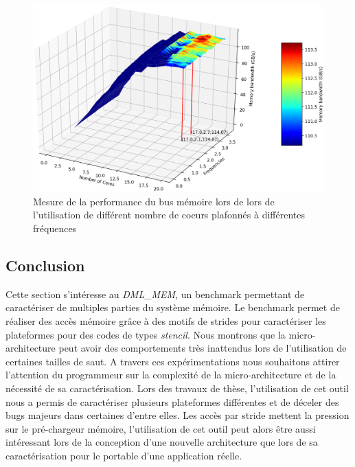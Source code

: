     \begin{figure}
    \center
    \includegraphics[width=14cm]{images/dml_core_vs_freq.png}
    \caption{\label{pic:dml_core_vs_freq} Mesure de la performance du bus mémoire lors de lors de l'utilisation de différent nombre de coeurs plafonnés à différentes fréquences}
    \end{figure}
    


    
    

\subsection{Conclusion}

    Cette section s'intéresse au \textit{DML\_MEM}, un benchmark permettant de caractériser de multiples parties du système mémoire. Le benchmark permet de réaliser des accès mémoire grâce à des motifs de strides pour caractériser les plateformes pour des codes de types \textit{stencil}.
    Nous montrons que la micro-architecture peut avoir des comportements très inattendus lors de l'utilisation de certaines tailles de saut. A travers ces expérimentations nous souhaitons attirer l'attention du programmeur sur la complexité de la micro-architecture et de la nécessité de sa caractérisation.
    Lors des travaux de thèse, l'utilisation de cet outil nous a permis de caractériser plusieurs plateformes différentes et de déceler des bugs majeurs dans certaines d'entre elles. Les accès par stride mettent la pression sur le pré-chargeur mémoire, l'utilisation de cet outil peut alors être aussi intéressant lors de la conception d'une nouvelle architecture que lors de sa caractérisation pour le portable d'une application réelle. 